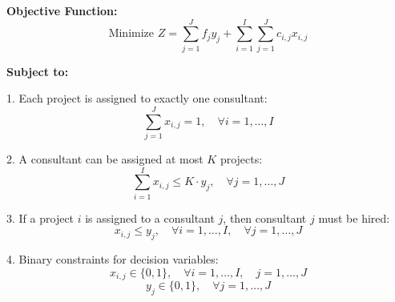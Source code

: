 \documentclass{article}
\begin{document}
\textbf{Objective Function:}
\[
\text{Minimize } Z = \sum_{j=1}^{J} f_j y_j + \sum_{i=1}^{I} \sum_{j=1}^{J} c_{i,j} x_{i,j}
\]

\textbf{Subject to:}

1. Each project is assigned to exactly one consultant:
\[
\sum_{j=1}^{J} x_{i,j} = 1, \quad \forall i = 1, \ldots, I
\]

2. A consultant can be assigned at most \( K \) projects:
\[
\sum_{i=1}^{I} x_{i,j} \leq K \cdot y_j, \quad \forall j = 1, \ldots, J
\]

3. If a project \( i \) is assigned to a consultant \( j \), then consultant \( j \) must be hired:
\[
x_{i,j} \leq y_j, \quad \forall i = 1, \ldots, I, \quad \forall j = 1, \ldots, J
\]

4. Binary constraints for decision variables:
\[
x_{i,j} \in \{0, 1\}, \quad \forall i = 1, \ldots, I, \quad j = 1, \ldots, J
\]
\[
y_j \in \{0, 1\}, \quad \forall j = 1, \ldots, J
\]
\end{document}
